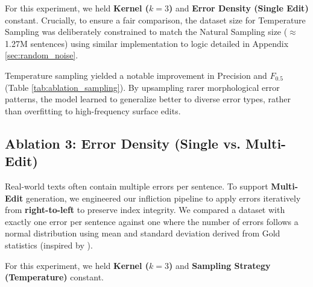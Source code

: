 \documentclass[11pt]{article}
\begin{document}
For this experiment, we held \textbf{Kernel ($k=3$)} and \textbf{Error Density (Single Edit)} constant. Crucially, to ensure a fair comparison, the dataset size for Temperature Sampling was deliberately constrained to match the Natural Sampling size ($\approx$ 1.27M sentences) using similar implementation to logic detailed in Appendix \ref{sec:random_noise}.

\begin{table}[h]
\centering
\small
{}
\caption{Impact of Sampling Strategy. Both datasets contained $\approx$ 1.27M sentences.}
\label{tab:ablation_sampling}
\end{table}

Temperature sampling yielded a notable improvement in Precision and $F_{0.5}$ (Table \ref{tab:ablation_sampling}). By upsampling rarer morphological error patterns, the model learned to generalize better to diverse error types, rather than overfitting to high-frequency surface edits.

\subsection{Ablation 3: Error Density (Single vs. Multi-Edit)}
Real-world texts often contain multiple errors per sentence. To support \textbf{Multi-Edit} generation, we engineered our infliction pipeline to apply errors iteratively from \textbf{right-to-left} to preserve index integrity. We compared a dataset with exactly one error per sentence against one where the number of errors follows a normal distribution using mean and standard deviation derived from Gold statistics (inspired by \cite{grundkiewicz-etal-2019-neural}).

For this experiment, we held \textbf{Kernel ($k=3$)} and \textbf{Sampling Strategy (Temperature)} constant.

\begin{table}[h]
\centering
\small
{}
\caption{Impact of Error Density on GEC performance.}
\label{tab:ablation_density}
\end{table}
\end{document}
